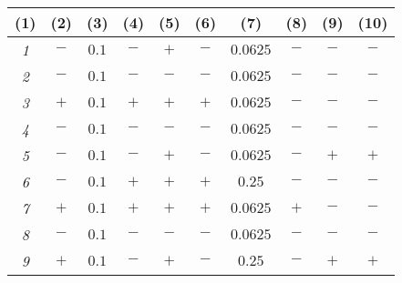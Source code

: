 \documentclass{article}
\begin{document}
\begin{enumerate}
\begin{enumerate}
\begin{center}
\begin{tabular}{|c|c||c|c|c|c||c|c|c|c|}
              \tiny{(1)} & \tiny{(2)} & \tiny{(3)} & \tiny{(4)} &  \tiny{(5)} & \tiny{(6)} & \tiny{(7)} & \tiny{(8)} & \tiny{(9)} & \tiny{(10)}\\
                    \hline \hline
                          {\em 1} & $-$ & $0.1$ & $-$ & $+$ & $-$ & $0.0625$ & $-$ & $-$ & $-$ \\
                                \hline
                                      {\em 2} & $-$ & $0.1$ & $-$ & $-$ & $-$ & $0.0625$ & $-$ & $-$ & $-$ \\
                                            \hline
                                                  {\em 3} & $+$ & $0.1$ & $+$ & $+$ & $+$ & $0.0625$ & $-$ & $-$ & $-$ \\
                                                        \hline
                                                              {\em 4} & $-$ & $0.1$ & $-$ & $-$ & $-$ & $0.0625$ & $-$ & $-$ & $-$ \\
                                                                    \hline
                                                                          {\em 5} & $-$ & $0.1$ & $-$ & $+$ & $-$ & $0.0625$ & $-$ & $+$ & $+$ \\
                                                                                \hline
                                                                                      {\em 6} & $-$ & $0.1$ & $+$ & $+$ & $+$ & $0.25$ & $-$ & $-$ & $-$ \\
                                                                                            \hline
                                                                                                  {\em 7} & $+$ & $0.1$ & $+$ & $+$ & $+$ & $0.0625$ & $+$ & $-$ & $-$ \\
                                                                                                        \hline
                                                                                                              {\em 8} & $-$ & $0.1$ & $-$ & $-$ & $-$ & $0.0625$ & $-$ & $-$ & $-$ \\
                                                                                                                    \hline
                                                                                                                          {\em 9} & $+$ & $0.1$ & $-$ & $+$ & $-$ & $0.25$ & $-$ & $+$ & $+$ \\
                                                                                                                                \hline

\end{tabular}
\end{center}
\end{enumerate}
\end{enumerate}
\end{document}

